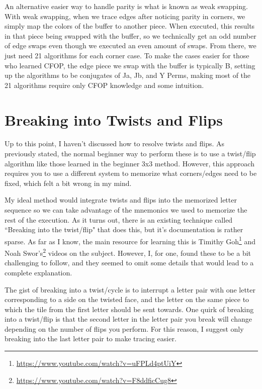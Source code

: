 \documentclass{article}
\begin{document}
An alternative easier way to handle parity is what is known as weak swapping. With weak swapping, when we trace edges after noticing parity in corners, we simply map the colors of the buffer to another piece. When executed, this results in that piece being swapped with the buffer, so we technically get an odd number of edge swaps even though we executed an even amount of swaps. From there, we just need 21 algorithms for each corner case. To make the cases easier for those who learned CFOP, the edge piece we swap with the buffer is typically B, setting up the algorithms to be conjugates of Ja, Jb, and Y Perms, making most of the 21 algorithms require only CFOP knowledge and some intuition.


\section{Breaking into Twists and Flips}

Up to this point, I haven't discussed how to resolve twists and flips. As previously stated, the normal beginner way to perform these is to use a twist/flip algorithm like those learned in the beginner 3x3 method. However, this approach requires you to use a different system to memorize what corners/edges need to be fixed, which felt a bit wrong in my mind.

My ideal method would integrate twists and flips into the memorized letter sequence so we can take advantage of the mnemonics we used to memorize the rest of the execution. As it turns out, there is an existing technique called ``Breaking into the twist/flip" that does this, but it's documentation is rather sparse. As far as I know, the main resource for learning this is Timithy Goh\footnote{\url{https://www.youtube.com/watch?v=uFPLd4ptUiY}} and Noah Swor's\footnote{\url{https://www.youtube.com/watch?v=F8ddficCug8}} videos on the subject. However, I, for one, found these to be a bit challenging to follow, and they seemed to omit some details that would lead to a complete explanation.

The gist of breaking into a twist/cycle is to interrupt a letter pair with one letter corresponding to a side on the twisted face, and the letter on the same piece to which the tile from the first letter should be sent towards. One quirk of breaking into a twist/flip is that the second letter in the letter pair you break will change depending on the number of flips you perform. For this reason, I suggest only breaking into the last letter pair to make tracing easier.
\end{document}
